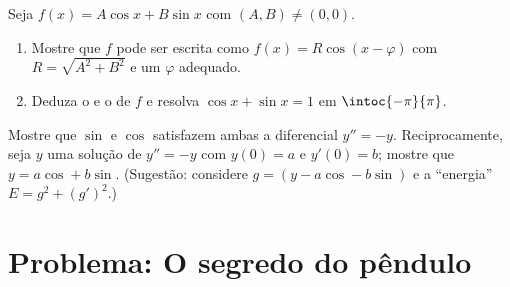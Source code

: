\begin{exercise}[$\star\star\star$]\label{exo:g12:trigo:8}
Seja $f(x) = A\cos x + B \sin x$ com $(A,B) \neq (0,0)$.
\begin{enumerate}
  \item Mostre que $f$ pode ser escrita como $f(x) = R\cos(x - \varphi)$
        com $R = \sqrt{A^2 + B^2}$ e um $\varphi$ adequado.
  \item Deduza o  e o  de $f$ e resolva
        $\cos x + \sin x = 1$ em $\intoc{-\pi}{\pi}$.
\end{enumerate}
\end{exercise}

\begin{exercise}[$\star\star\star$]\label{exo:g12:trigo:9}
Mostre que $\sin$ e $\cos$ satisfazem ambas a  diferencial
$y'' = -y$. Reciprocamente, seja $y$ uma solução de $y'' = -y$ com
$y(0) = a$ e $y'(0) = b$; mostre que $y = a\cos + b\sin$. (Sugestão:
considere $g = (y - a\cos - b\sin)$ e a ``energia''
$E = g^2 + (g')^2$.)
\end{exercise}

\section{Problema: O segredo do pêndulo}

